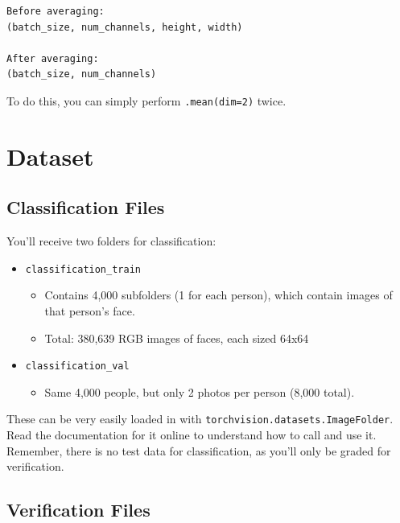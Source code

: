 \documentclass{article}
\newcommand{\ttt}[1]{\texttt{#1}}
\begin{document}
\begin{verbatim}
Before averaging:
(batch_size, num_channels, height, width)

After averaging:
(batch_size, num_channels)
\end{verbatim}

To do this, you can simply perform \ttt{.mean(dim=2)} twice. \\

\newpage{}


\section{Dataset}

\subsection{Classification Files} 

You'll receive two folders for classification:

\begin{itemize}
    \item \ttt{classification\_train}
        \begin{itemize}
            \item Contains 4,000 subfolders (1 for each person), which contain images of that person's face.
            \item Total: 380,639 RGB images of faces, each sized 64x64
        \end{itemize}
    \item \ttt{classification\_val}
        \begin{itemize}
            \item Same 4,000 people, but only 2 photos per person (8,000 total).
        \end{itemize}
\end{itemize}

These can be very easily loaded in with \ttt{torchvision.datasets.ImageFolder}. Read the documentation for it online to understand how to call and use it. \\

Remember, there is no test data for classification, as you'll only be graded for verification.

\subsection{Verification Files}
\end{document}
